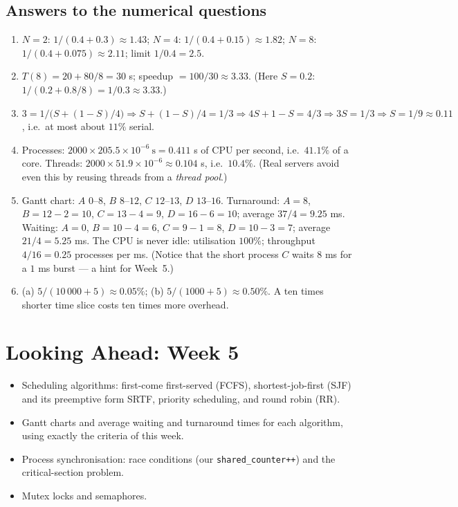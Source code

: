 \documentclass[11pt,a4paper]{article}
\newcommand{\cmd}[1]{\texttt{#1}}
\begin{document}
\subsection*{Answers to the numerical questions}
\begin{enumerate}[leftmargin=1.6em,start=13]
  \item $N=2$: $1/(0.4 + 0.3) \approx 1.43$; $N=4$: $1/(0.4 + 0.15) \approx 1.82$; $N=8$: $1/(0.4 + 0.075) \approx 2.11$; limit $1/0.4 = 2.5$.
  \item $T(8) = 20 + 80/8 = 30$ s; speedup $= 100/30 \approx 3.33$. (Here $S = 0.2$: $1/(0.2 + 0.8/8) = 1/0.3 \approx 3.33$.)
  \item $3 = 1/\bigl(S + (1-S)/4\bigr) \Rightarrow S + (1-S)/4 = 1/3 \Rightarrow 4S + 1 - S = 4/3 \Rightarrow 3S = 1/3 \Rightarrow S = 1/9 \approx 0.11$, i.e.\ at most about $11\%$ serial.
  \item Processes: $2000 \times 205.5\times10^{-6}\ \text{s} = 0.411$ s of CPU per second, i.e.\ $41.1\%$ of a core. Threads: $2000 \times 51.9\times10^{-6} \approx 0.104$ s, i.e.\ $10.4\%$. (Real servers avoid even this by reusing threads from a \emph{thread pool}.)
  \item Gantt chart: $A$ $0$--$8$, $B$ $8$--$12$, $C$ $12$--$13$, $D$ $13$--$16$. Turnaround: $A = 8$, $B = 12-2 = 10$, $C = 13-4 = 9$, $D = 16-6 = 10$; average $37/4 = 9.25$ ms. Waiting: $A = 0$, $B = 10-4 = 6$, $C = 9-1 = 8$, $D = 10-3 = 7$; average $21/4 = 5.25$ ms. The CPU is never idle: utilisation $100\%$; throughput $4/16 = 0.25$ processes per ms. (Notice that the short process $C$ waits $8$ ms for a $1$ ms burst --- a hint for Week~5.)
  \item (a) $5/(10\,000 + 5) \approx 0.05\%$; (b) $5/(1000 + 5) \approx 0.50\%$. A ten times shorter time slice costs ten times more overhead.
\end{enumerate}

\section{Looking Ahead: Week 5}

\begin{itemize}
  \item Scheduling algorithms: first-come first-served (FCFS), shortest-job-first (SJF) and its preemptive form SRTF, priority scheduling, and round robin (RR).
  \item Gantt charts and average waiting and turnaround times for each algorithm, using exactly the criteria of this week.
  \item Process synchronisation: race conditions (our \cmd{shared\_counter++}) and the critical-section problem.
  \item Mutex locks and semaphores.
\end{itemize}
\end{document}
